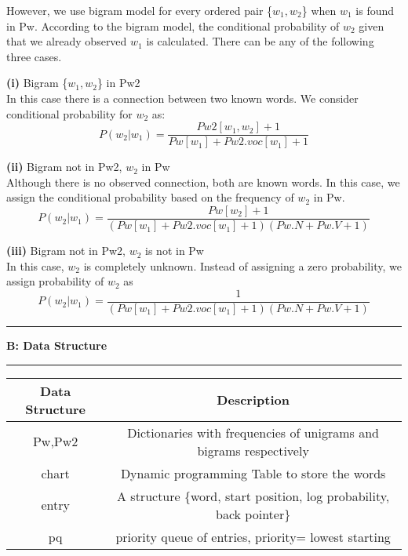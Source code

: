 \documentclass[11pt]{article}
\newcommand\question[2]{\vspace{.25in}\hrule\textbf{#1: #2}\vspace{.5em}\hrule\vspace{.10in}}
\renewcommand\part[1]{\vspace{.10in}\textbf{(#1)}}
\begin{document}
However, we use bigram model for every ordered pair \{$w_1,w_2$\} when $w_1$ is found in Pw. According to the bigram model, the conditional probability of $w_2$ given that we already observed $w_1$ is calculated. There can be any of the following three cases. 

\part{i} Bigram \{$w_1,w_2$\} in Pw2\\
In this case there is a connection between two known words. We consider conditional probability for $w_2$ as:
\begin{equation}
	P(w_2|w_1)=\frac{Pw2[w_1,w_2]+1}{Pw[w_1]+Pw2.voc[w_1]+1}
\end{equation}

\part{ii} Bigram not in Pw2, $w_2$ in Pw\\
Although there is no observed connection, both are known words. In this case, we assign the conditional probability based on the frequency of $w_2$ in Pw. 
\begin{equation}
	P(w_2|w_1)=\frac{Pw[w_2]+1}{(Pw[w_1]+Pw2.voc[w_1]+1)(Pw.N+Pw.V+1)}
\end{equation}

\part{iii} Bigram not in Pw2, $w_2$ is not in Pw\\
In this case, $w_2$ is completely unknown. Instead of assigning a zero probability, we assign probability of $w_2$ as \\
\begin{equation}
P(w_2|w_1)=\frac{1}{(Pw[w_1]+Pw2.voc[w_1]+1)(Pw.N+Pw.V+1)}
\end{equation}

\question{B}{Data Structure}

\begin{table}[h]
	\vspace{-4pt}
	\centering
	\renewcommand\arraystretch{1.25}
	\begin{tabular}{|c|c|}
		\hline
		Data Structure   & Description  \\
		\hline
		Pw,Pw2 & Dictionaries with frequencies of unigrams and bigrams respectively \\
		\hline
		chart &Dynamic programming Table to store the words\\
		\hline
		entry & A structure \{word, start position, log probability, back pointer\}  \\
		\hline
		pq & priority queue of entries, priority= lowest starting   \\
		\hline
	\end{tabular}
	\vspace{-6pt}
\end{table}
\end{document}

